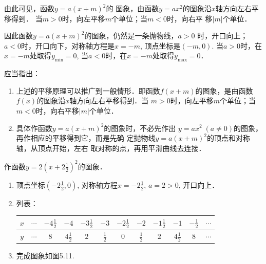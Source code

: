 由此可见，函数$y=a(x+m)^2$的
图象，由函数$y=ax^2$的图象沿$x$轴方向左右平移得到．
当$m>0$时，向左平移$m$个单位；当$m<0$时，向右平
移$|m|$个单位．

因此函数$y=a(x+m)^2$的图象，仍然是一条抛物线，$a>0$
时，开口向上；$a<0$时，开口向下，对称轴方程是$x=-m$,
顶点坐标是$(-m,0)$. 当$a>0$时，在$x=-m$处取得$y_{\min}=0$, 当$a<0$时，在$x=-m$处取得$y_{\max}=0$．

应当指出：
\begin{enumerate}
    \item 上述的平移原理可以推广到一般情形．即函数$f(x+m)$的图象，是由函数$f(x)$的图象沿$x$轴方向左右平移得到．当
    $m>0$时，向左平移$m$个单位；当$m<0$时，向右平移$|m|$个单位．
    \item 具体作函数$y=a(x+m)^2$的图象时，不必先作出
    $y=ax^2\; (a\ne 0)$的图象，再作相应的平移得到它，而是先确
    定抛物线$y=a(x+m)^2$的顶点和对称轴，从顶点开始，左右
    取对称的点，再用平滑曲线去连接．
\end{enumerate}

\begin{example}
    作函数$y=2\left(x+2\frac{1}{2}\right)^2$的图象．
\end{example}

\begin{solution}
\begin{enumerate}
    \item 顶点坐标$\left(-2\frac{1}{2},0\right)$, 对称轴方程$x=-2\frac{1}{2}$,
    $a=2>0$, 开口向上．
    \item 列表：
\begin{center}
\begin{tabular}{c|ccccccccccc}
\hline
$x$&$\cdots$& $-4\tfrac{1}{2}$ &  $-4$ &  $-3\tfrac{1}{2}$ &  $-3$ &  $-2\tfrac{1}{2}$ &  $-2$ &  $-1\tfrac{1}{2}$ &  $-1$ &  $-\tfrac{1}{2}$ &$\cdots$\\
\hline
$y$&$\cdots$ & $8$& $4\tfrac{1}{2}$ &  $2$ &  $\tfrac{1}{2}$ &  $0$ &  $\tfrac{1}{2}$ &  $2$ &  $4\tfrac{1}{2}$ &  $8$ &  $\cdots$ \\
\hline
\end{tabular}
\end{center}

\item 完成图象如图5.11.
\end{enumerate}      

\begin{figure}[htp]
    \centering
{}
    \caption{}
\end{figure}
\end{solution}


